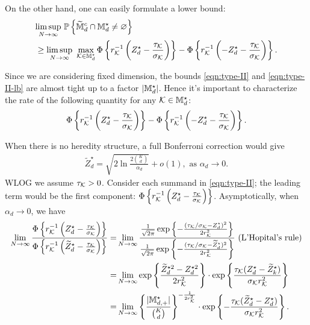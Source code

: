 \documentclass[12pt]{article}
\begin{document}
On the other hand, one can easily formulate a lower bound:
\begin{align}\label{eqn:type-II-lb}
        &\underset{N\to\infty}{\lim\sup}~{\mathbb{P}}\left\{\widetilde{{\mathbb{M}}}^c_{d}\cap{\mathbb{M}}^{\star }_d\neq \varnothing\right\} \notag\\
        & \ge \underset{N\to\infty}{\lim\sup}~\max_{{\mathcal{K}}\in{\mathbb{M}}_d^\star} \Phi\left\{r_{{\mathcal{K}}}^{-1}\left(Z_d^\star - \frac{\tau_{\mathcal{K}}}{\sigma_{\mathcal{K}}}\right)\right\} - \Phi\left\{r_{{\mathcal{K}}}^{-1}\left(-Z_d^\star - \frac{\tau_{\mathcal{K}}}{\sigma_{\mathcal{K}}}\right)\right\}.
\end{align}

Since we are considering fixed dimension, the bounds \eqref{eqn:type-II} and \eqref{eqn:type-II-lb} are almost tight up to a factor $|{\mathbb{M}}^\star_{d}|$. Hence it's important to characterize the rate of the following quantity for any ${\mathcal{K}}\in{\mathbb{M}}_d^\star$:
\begin{align*}
    \Phi\left\{r_{{\mathcal{K}}}^{-1}\left(Z_d^\star - \frac{\tau_{\mathcal{K}}}{\sigma_{\mathcal{K}}}\right)\right\} - \Phi\left\{r_{{\mathcal{K}}}^{-1}\left(-Z_d^\star - \frac{\tau_{\mathcal{K}}}{\sigma_{\mathcal{K}}}\right)\right\}.
\end{align*}

When there is no heredity structure, a full Bonferroni correction would give
\begin{align*}
    \tilde{Z}_d^\star = \sqrt{2\ln\frac{2{K \choose d}}{\alpha_d}} + o(1), \text{ as } \alpha_d \to 0.
\end{align*}
WLOG we assume $\tau_{\mathcal{K}} > 0$. Consider each summand in \eqref{eqn:type-II}; the leading term would be the first component:
$\Phi\left\{r_{\mathcal{K}}^{-1}\left(Z_d^\star - \frac{\tau_{\mathcal{K}}}{\sigma_{\mathcal{K}}}\right)\right\}$. Asymptotically, when $\alpha_d\to 0$,  we have
\begin{align*}
    \lim_{N\to\infty}\frac{\Phi\left\{r_{{\mathcal{K}}}^{-1}\left(Z_d^\star - \frac{\tau_{\mathcal{K}}}{\sigma_{\mathcal{K}}}\right)\right\}}{\Phi\left\{r_{\mathcal{K}}^{-1}\left(\widetilde{Z}_d^\star - \frac{\tau_{\mathcal{K}}}{\sigma_{\mathcal{K}}}\right)\right\}}
    = & \lim_{N\to\infty}\frac{ \frac{1}{\sqrt{2\pi}} \exp\left\{ -\frac{(\tau_{\mathcal{K}}/\sigma_{\mathcal{K}}-Z_d^\star)^2}{2r^2_{\mathcal{K}}} \right\} }{ \frac{1}{\sqrt{2\pi}} \exp\left\{ -\frac{(\tau_{\mathcal{K}}/\sigma_{\mathcal{K}}-\widetilde{Z}_d^\star)^2}{2r^2_{\mathcal{K}}} \right\}} \text{ (L'Hopital's rule)}\\
    = & \lim_{N\to\infty}\exp\left\{\frac{\widetilde{Z}_d^{\star 2} - Z_d^{\star 2}}{2r_{\mathcal{K}}^2}\right\}\cdot \exp\left\{\frac{\tau_{\mathcal{K}}(Z_d^\star - \widetilde{Z}_k^\star)}{\sigma_{\mathcal{K}} r_{\mathcal{K}}^2}\right\}\\
    = & \lim_{N\to\infty} \left\{\frac{|{\mathbb{M}}^\star_{d,+}|}{{K \choose d}}\right\}^{-\frac{1}{2r_{\mathcal{K}}^2}} \cdot \exp\left\{-\frac{\tau_{\mathcal{K}}(\widetilde{Z}_d^\star - {Z}_d^\star)}{\sigma_{\mathcal{K}} r_{\mathcal{K}}^2}\right\}.
\end{align*}
\end{document}
